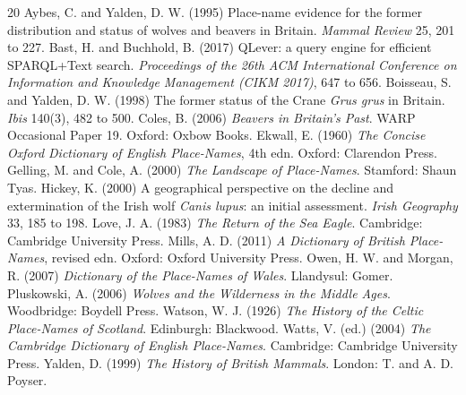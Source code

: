 \documentclass[11pt,a4paper]{article}
\begin{document}
\begin{thebibliography}{20}
 Aybes, C. and Yalden, D. W. (1995) Place-name evidence for the former distribution and status of wolves and beavers in Britain. \textit{Mammal Review} 25, 201 to 227.
 Bast, H. and Buchhold, B. (2017) QLever: a query engine for efficient SPARQL+Text search. \textit{Proceedings of the 26th ACM International Conference on Information and Knowledge Management (CIKM 2017)}, 647 to 656.
 Boisseau, S. and Yalden, D. W. (1998) The former status of the Crane \textit{Grus grus} in Britain. \textit{Ibis} 140(3), 482 to 500.
 Coles, B. (2006) \textit{Beavers in Britain's Past}. WARP Occasional Paper 19. Oxford: Oxbow Books.
 Ekwall, E. (1960) \textit{The Concise Oxford Dictionary of English Place-Names}, 4th edn. Oxford: Clarendon Press.
 Gelling, M. and Cole, A. (2000) \textit{The Landscape of Place-Names}. Stamford: Shaun Tyas.
 Hickey, K. (2000) A geographical perspective on the decline and extermination of the Irish wolf \textit{Canis lupus}: an initial assessment. \textit{Irish Geography} 33, 185 to 198.
 Love, J. A. (1983) \textit{The Return of the Sea Eagle}. Cambridge: Cambridge University Press.
 Mills, A. D. (2011) \textit{A Dictionary of British Place-Names}, revised edn. Oxford: Oxford University Press.
 Owen, H. W. and Morgan, R. (2007) \textit{Dictionary of the Place-Names of Wales}. Llandysul: Gomer.
 Pluskowski, A. (2006) \textit{Wolves and the Wilderness in the Middle Ages}. Woodbridge: Boydell Press.
 Watson, W. J. (1926) \textit{The History of the Celtic Place-Names of Scotland}. Edinburgh: Blackwood.
 Watts, V. (ed.) (2004) \textit{The Cambridge Dictionary of English Place-Names}. Cambridge: Cambridge University Press.
 Yalden, D. (1999) \textit{The History of British Mammals}. London: T. and A. D. Poyser.
\end{thebibliography}
\end{document}
